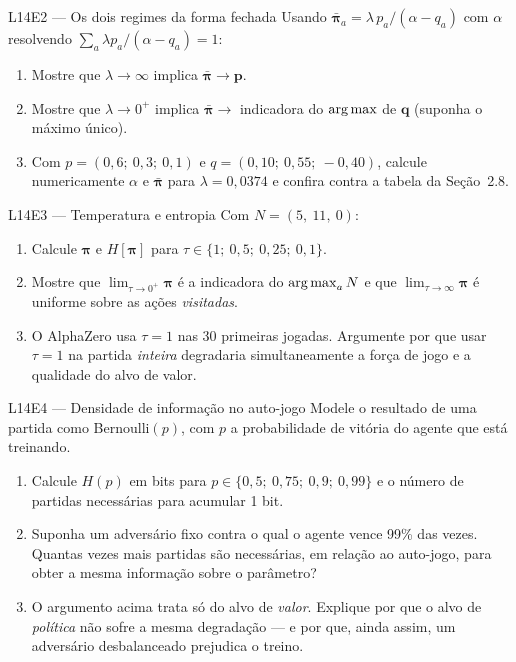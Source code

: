 \documentclass[11pt]{article}
\newcommand{\Nvis}{N}
\newcommand{\raizpol}{\bm{\pi}}
\begin{document}
\begin{exbox}{L14E2 — Os dois regimes da forma fechada}
Usando $\bar{\raizpol}_a = \lambda\,p_a/(\alpha - q_a)$ com $\alpha$ resolvendo
$\sum_a \lambda p_a/(\alpha - q_a) = 1$:
\begin{enumerate}
  \item Mostre que $\lambda \to \infty$ implica $\bar{\raizpol} \to \bm{p}$.
  \item Mostre que $\lambda \to 0^{+}$ implica $\bar{\raizpol} \to$ indicadora do
        $\operatorname*{arg\,max}$ de $\bm{q}$ (suponha o máximo único).
  \item Com $p = (0{,}6;\ 0{,}3;\ 0{,}1)$ e $q = (0{,}10;\ 0{,}55;\ -0{,}40)$,
        calcule numericamente $\alpha$ e $\bar{\raizpol}$ para $\lambda = 0{,}0374$
        e confira contra a tabela da Seção~2.8.
\end{enumerate}
\end{exbox}

\begin{exbox}{L14E3 — Temperatura e entropia}
Com $\Nvis = (5,\ 11,\ 0)$:
\begin{enumerate}
  \item Calcule $\raizpol$ e $H[\raizpol]$ para $\tau \in \{1;\ 0{,}5;\ 0{,}25;\ 0{,}1\}$.
  \item Mostre que $\lim_{\tau\to 0^{+}} \raizpol$ é a indicadora do $\argmax_a \Nvis$
        e que $\lim_{\tau\to\infty} \raizpol$ é uniforme sobre as ações
        \emph{visitadas}.
  \item O AlphaZero usa $\tau = 1$ nas 30 primeiras jogadas. Argumente por que
        usar $\tau = 1$ na partida \emph{inteira} degradaria simultaneamente a
        força de jogo e a qualidade do alvo de valor.
\end{enumerate}
\end{exbox}

\begin{exbox}{L14E4 — Densidade de informação no auto-jogo}
Modele o resultado de uma partida como Bernoulli$(p)$, com $p$ a probabilidade de
vitória do agente que está treinando.
\begin{enumerate}
  \item Calcule $H(p)$ em bits para $p \in \{0{,}5;\ 0{,}75;\ 0{,}9;\ 0{,}99\}$ e
        o número de partidas necessárias para acumular 1 bit.
  \item Suponha um adversário fixo contra o qual o agente vence 99\% das vezes.
        Quantas vezes mais partidas são necessárias, em relação ao auto-jogo, para
        obter a mesma informação sobre o parâmetro?
  \item O argumento acima trata só do alvo de \emph{valor}. Explique por que o
        alvo de \emph{política} não sofre a mesma degradação — e por que, ainda
        assim, um adversário desbalanceado prejudica o treino.
\end{enumerate}
\end{exbox}
\end{document}

